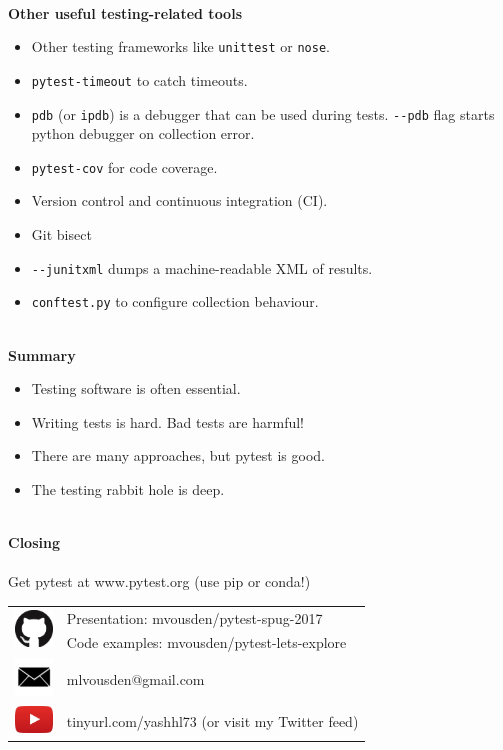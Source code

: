 \documentclass[12pt]{article}
\newcommand{\slidetitle}[1]{~\\[-0.5ex]{\Large\bf{\color{bold}#1}}\\}
\begin{document}
\slidetitle{Other useful testing-related tools}
\begin{itemize}[itemsep=0cm]
\item Other testing frameworks like \verb|unittest| or \verb|nose|.
\item \verb|pytest-timeout| to catch timeouts.
\item \verb|pdb| (or \verb|ipdb|) is a debugger that can be used during
    tests. \verb|--pdb| flag starts python debugger on collection error.
\item \verb|pytest-cov| for code coverage.
\item Version control and continuous integration (CI).
\item Git bisect
\item \verb|--junitxml| dumps a machine-readable XML of results.
\item \verb|conftest.py| to configure collection behaviour.
\end{itemize}
\clearpage

\slidetitle{Summary}
\begin{itemize}
\item Testing software is often essential.
\item Writing tests is hard. Bad tests are harmful!
\item There are many approaches, but pytest is good.
\item The testing rabbit hole is deep.
\end{itemize}
\clearpage

\slidetitle{Closing}\\[0.5cm]
Get pytest at www.pytest.org (use pip or conda!)
\vfill
\renewcommand{\arraystretch}{1.2}
\begin{tabular}{ll}
\multirow{2}{*}{\includegraphics[width=1cm]{github.png}} &
Presentation: mvousden/pytest-spug-2017 \\
& Code examples: mvousden/pytest-lets-explore \\
\multirow{2}{*}{\includegraphics[width=1cm]{email.png}} &
\multirow{2}{*}{mlvousden@gmail.com} \\ \\
\multirow{2}{*}{\includegraphics[width=1cm]{youtube.png}} &
\multirow{2}{*}{tinyurl.com/yashhl73 (or visit my Twitter feed)} \\ \\
\end{tabular}
\vfill
\clearpage
\end{document}
